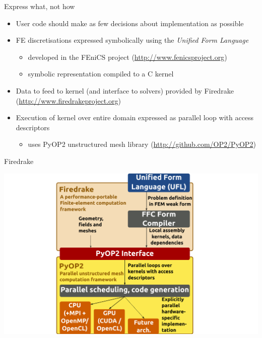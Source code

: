 \documentclass[bigger]{beamer}
\begin{document}
\begin{frame}[label={sec:orgheadline7}]{Express what, not how}
\begin{itemize}
\item User code should make as few decisions about implementation as
possible
\item FE discretisations expressed symbolically using the \emph{Unified Form Language}
\begin{itemize}
\item developed in the FEniCS project (\url{http://www.fenicsproject.org})
\item symbolic representation compiled to a C kernel
\end{itemize}
\item Data to feed to kernel (and interface to solvers) provided by
Firedrake (\url{http://www.firedrakeproject.org})
\item Execution of kernel over entire domain expressed as parallel loop
with access descriptors
\begin{itemize}
\item uses PyOP2 unstructured mesh library (\url{http://github.com/OP2/PyOP2})
\end{itemize}
\end{itemize}
\end{frame}

\begin{frame}[plain,label={sec:orgheadline8}]{Firedrake}
\begin{center}
\includegraphics[height=1\textheight]{03-12-PRISM-firedrake-overview.figures/firedrake_toolchain}
\end{center}
\end{frame}
\end{document}
